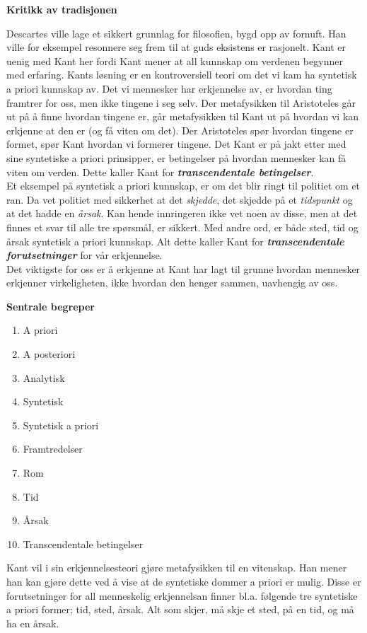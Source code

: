 \documentclass[11pt, a4paper]{article}
\newenvironment{sectionbox}[1][]{%
    \begin{sectionboxinner}
    \textbf{\large #1}
    \vspace{1pt}
    \newline
}{%
    \end{sectionboxinner}
}
\begin{document}
\begin{sectionbox}[Kritikk av tradisjonen]

Descartes ville lage et sikkert grunnlag for filosofien, bygd opp av fornuft. Han ville for eksempel resonnere seg frem til at guds eksistens er rasjonelt. Kant er uenig med Kant her fordi Kant mener at all kunnskap om verdenen begynner med erfaring. Kants løsning er en kontroversiell teori om det vi kam ha syntetisk a priori kunnskap av. Det vi mennesker har erkjennelse av, er hvordan ting framtrer for oss, men ikke tingene i seg selv. Der metafysikken til Aristoteles går ut på å finne hvordan tingene er, går metafysikken til Kant ut på hvordan vi kan erkjenne at den er (og få viten om det). Der Aristoteles spør hvordan tingene er formet, spør Kant hvordan vi formerer tingene. Det Kant er på jakt etter med sine syntetiske a priori prinsipper, er betingelser på hvordan mennesker kan få viten om verden. Dette kaller Kant for \textbf{\textit{transcendentale betingelser}}.\\


Et eksempel på syntetisk a priori kunnskap, er om det blir ringt til politiet om et ran. Da vet politiet med sikkerhet at det \textit{skjedde}, det skjedde på et \textit{tidspunkt} og at det hadde en \textit{årsak}. Kan hende innringeren ikke vet noen av disse, men at det finnes et svar til alle tre spørsmål, er sikkert. Med andre ord, er både sted, tid og årsak syntetisk a priori kunnskap. Alt dette kaller Kant for \textbf{\textit{transcendentale forutsetninger}} for vår erkjennelse.\\


Det viktigste for oss er å erkjenne at Kant har lagt til grunne hvordan mennesker erkjenner virkeligheten, ikke hvordan den henger sammen, uavhengig av oss.

\end{sectionbox}


\begin{sectionbox}[Sentrale begreper]
\begin{enumerate}
    \item A priori
    \item A posteriori
    \item Analytisk
    \item Syntetisk
    \item Syntetisk a priori
    \item Framtredelser
    \item Rom
    \item Tid
    \item Årsak
    \item Transcendentale betingelser
\end{enumerate}

Kant vil i sin erkjennelsesteori gjøre metafysikken til en vitenskap. Han mener han kan gjøre dette ved å vise at de syntetiske dommer a priori er mulig. Disse er forutsetninger for all menneskelig erkjennelsan finner bl.a. følgende tre syntetiske a priori former; tid, sted, årsak. Alt som skjer, må skje et sted, på en tid, og må ha en årsak. 
\end{sectionbox}
\end{document}
